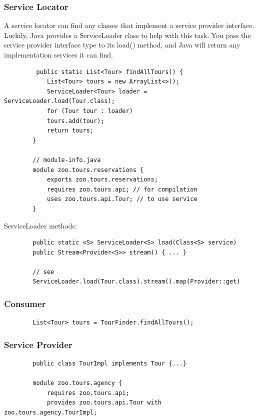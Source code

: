 \documentclass{scrartcl}
\begin{document}
\subsubsection{Service Locator}

    A service locator can find any classes that implement a service provider interface.
    Luckily, Java provides a ServiceLoader class to help with this task. You pass the service provider interface type to its load() method, and Java will return any implementation services it can find.

    \begin{lstlisting}
         public static List<Tour> findAllTours() {
            List<Tour> tours = new ArrayList<>();
            ServiceLoader<Tour> loader = ServiceLoader.load(Tour.class);
            for (Tour tour : loader)
            tours.add(tour);
            return tours;
        }

        // module-info.java
        module zoo.tours.reservations {
            exports zoo.tours.reservations;
            requires zoo.tours.api; // for compilation
            uses zoo.tours.api.Tour; // to use service
        }
    \end{lstlisting}

    ServiceLoader methods:

    \begin{lstlisting}
        public static <S> ServiceLoader<S> load(Class<S> service)
        public Stream<Provider<S>> stream() { ... }

        // see
        ServiceLoader.load(Tour.class).stream().map(Provider::get)
    \end{lstlisting}

\subsubsection{Consumer}

    \begin{lstlisting}
        List<Tour> tours = TourFinder.findAllTours();
    \end{lstlisting}


\subsubsection{Service Provider}

    \begin{lstlisting}
        public class TourImpl implements Tour {...}

        module zoo.tours.agency {
            requires zoo.tours.api;
            provides zoo.tours.api.Tour with zoo.tours.agency.TourImpl;
    \end{lstlisting}
\end{document}

